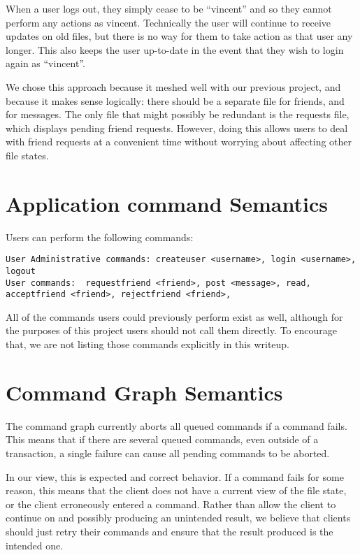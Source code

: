 \documentclass[11pt]{article}
\begin{document}
When a user logs out, they simply cease to be ``vincent'' and so they cannot perform any actions as vincent. Technically the user will continue to receive updates on old files, but there is no way for them to take action as that user any longer. This also keeps the user up-to-date in the event that they wish to login again as ``vincent''.

We chose this approach because it meshed well with our previous project, and because it makes sense logically: there should be a separate file for friends, and for messages. The only file that might possibly be redundant is the requests file, which displays pending friend requests. However, doing this allows users to deal with friend requests at a convenient time without worrying about affecting other file states.

\section{Application command Semantics}

Users can perform the following commands:
\begin{verbatim}
User Administrative commands: createuser <username>, login <username>, logout
User commands:  requestfriend <friend>, post <message>, read, acceptfriend <friend>, rejectfriend <friend>,
\end{verbatim}

All of the commands users could previously perform exist as well, although for the purposes of this project users should not call them directly. To encourage that, we are not listing those commands explicitly in this writeup.

\section{Command Graph Semantics}

The command graph currently aborts all queued commands if a command fails.  This means that if there are several queued commands, even outside of a transaction, a single failure can cause all pending commands to be aborted. 

In our view, this is expected and correct behavior. If a command fails for some reason, this means that the client does not have a current view of the file state, or the client erroneously entered a command. Rather than allow the client to continue on and possibly producing an unintended result, we believe that clients should just retry their commands and ensure that the result produced is the intended one.
\end{document}
